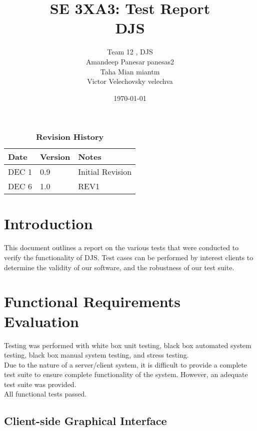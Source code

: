 \documentclass[12pt, titlepage]{article}
\title{SE 3XA3: Test Report\\DJS}
\author{Team 12 , DJS
		\\ Amandeep Panesar panesas2
		\\ Taha Mian miantm
		\\ Victor Velechovsky velechva
}
\date{\today}
\begin{document}
\maketitle

\tableofcontents
\listoftables
\listoffigures

\begin{table}[H]
\caption{\bf Revision History}
\begin{tabularx}{\textwidth}{p{3cm}p{2cm}X}
\toprule {\bf Date} & {\bf Version} & {\bf Notes}\\
\midrule
DEC 1 & 0.9 & Initial Revision\\
DEC 6 & 1.0 & REV1\\
\bottomrule
\end{tabularx}
\end{table}

\newpage


\section{Introduction}

This document outlines a report on the various tests that were conducted to verify the functionality of DJS. Test cases can be performed by interest clients to determine the validity of our software, and the robustness of our test suite.

\section{Functional Requirements Evaluation}
Testing was performed with white box unit testing, black box automated system testing, black box manual system testing, and stress testing.\\


Due to the nature of a server/client system, it is difficult to provide a complete test suite to ensure complete functionality of the system. However, an adequate test suite was provided. \\


All functional tests passed.


\subsection{Client-side Graphical Interface}
\end{document}
